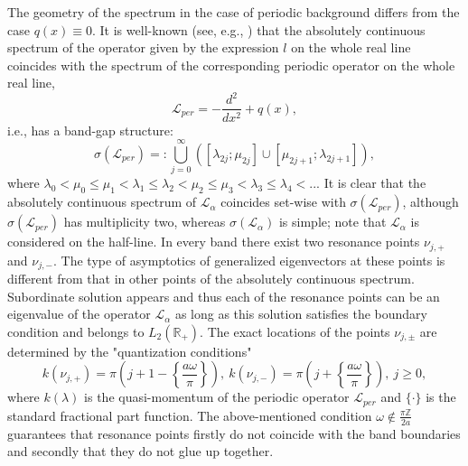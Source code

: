 \documentclass[a4paper,oneside,12pt]{amsart}
\begin{document}
The geometry  of the spectrum in the case of periodic background
differs from the case $q(x)\equiv0$. It is well-known (see, e.g.,
\cite{Kurasov-Naboko-2007}) that the absolutely continuous
spectrum of the operator given by the expression $l$ on the whole
real line coincides with the spectrum of the corresponding
periodic operator on the whole real line,
\begin{equation}\label{L-per}
    \mathcal L_{per}=-\frac{d^2}{dx^2}+q(x),
\end{equation}
i.e., has a band-gap structure:
\begin{equation*}
    \sigma(\mathcal L_{per})=:\bigcup\limits_{j=0}^{\infty}([\lambda_{2j};\mu_{2j}]\cup[\mu_{2j+1};\lambda_{2j+1}]),
\end{equation*}
where
$\lambda_0<\mu_0\le\mu_1<\lambda_1\le\lambda_2<\mu_2\le\mu_3<\lambda_3\le\lambda_4<...$
It is clear that the absolutely continuous spectrum of $\mathcal
L_{\alpha}$ coincides set-wise with $\sigma(\mathcal L_{per})$,
although $\sigma(\mathcal L_{per})$ has multiplicity two, whereas
 $\sigma(\mathcal L_{\alpha})$ is simple; note that $\mathcal
L_{\alpha}$ is considered on the half-line. In every band there
exist two resonance points $\nu_{j,+}$ and $\nu_{j,-}$. The type
of asymptotics of generalized eigenvectors at these points is
different from that in other points of the absolutely continuous
spectrum. Subordinate solution appears and thus each of the
resonance points can be an eigenvalue of the operator $\mathcal
L_{\alpha}$ as long as this solution satisfies the boundary
condition and belongs to $L_2(\mathbb R_+)$. The exact locations
of the points $\nu_{j,\pm}$ are determined by the "quantization
conditions" \cite{Kurasov-Naboko-2007}
\begin{equation*}
    k(\nu_{j,+})=\pi\left(j+1-\left\{\frac{a\omega}{\pi}\right\}\right),
    \
    k(\nu_{j,-})=\pi\left(j+\left\{\frac{a\omega}{\pi}\right\}\right),
    \
    j\ge0,
\end{equation*}
where $k(\lambda)$ is the quasi-momentum of the periodic operator
$\mathcal L_{per}$  and $\{\cdot\}$ is the standard fractional part
function. The above-mentioned condition
$\omega\notin\frac{\pi\mathbb Z}{2a}$ guarantees that resonance
points firstly do not coincide with the band boundaries and
secondly that they do not glue up together.
\end{document}
